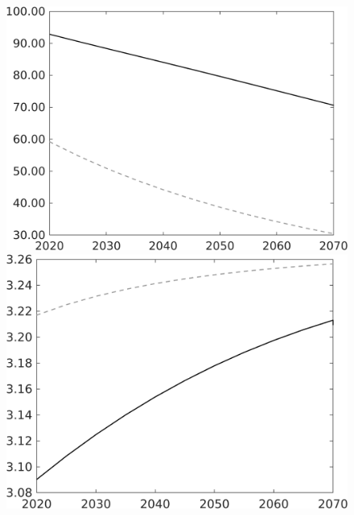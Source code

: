 \documentclass[12pt]{article}
\begin{document}
\begin{figure}
\begin{minipage}[]{0.32\textwidth}
	\end{minipage}
	\begin{minipage}[]{0.32\textwidth}
		\includegraphics[width=1\textwidth]{../../codding_model/own_basedOnFried/optimalPol_010922_revision/figures/all_13Sept22/LevTaufNoTauf_TaulCalib_Equlab_regime0_gAg_spillover0_nsk0_xgr0_knspil1_sep1_LFlimit0_emsbase0_countec0_GovRev0_etaa0.79_lgd0.png}
	\end{minipage}
	\begin{minipage}[]{0.32\textwidth}
		\includegraphics[width=1\textwidth]{../../codding_model/own_basedOnFried/optimalPol_010922_revision/figures/all_13Sept22/LevTaufNoTauf_TaulCalib_Equlab_regime0_gAn_spillover0_nsk0_xgr0_knspil1_sep1_LFlimit0_emsbase0_countec0_GovRev0_etaa0.79_lgd0.png}

\end{minipage}
\end{figure}
\end{document}
